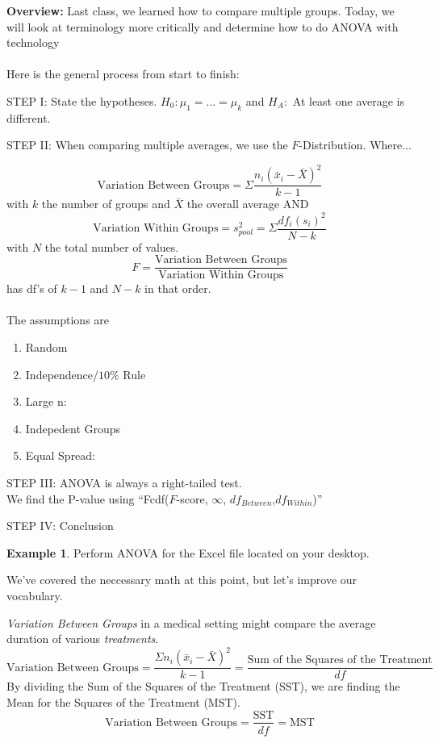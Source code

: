 \documentclass[12pt]{amsart}
\theoremstyle{definition}
\newtheorem{ex}{Example}
\begin{document}
 \textbf{Overview:} Last class, we learned how to compare multiple groups. Today, we will look at terminology more critically and determine how to do ANOVA with technology\\
 ~\\
Here is the general process from start to finish:
\begin{framed}
STEP I: State the hypotheses. $H_0:\mu_1=...=\mu_k$ and $H_A:$ At least one average is different.

STEP II: When comparing multiple averages, we use the $F$-Distribution. Where...

$$\text{Variation Between Groups}=\Sigma \frac{n_i(\bar{x}_i-\bar{X})^2}{k-1}$$ with $k$ the number of groups and $\bar{X}$ the overall average AND
$$\text{Variation Within Groups}=s_{pool}^2=\Sigma \frac{df_i(s_i)^2}{N-k}$$ with $N$ the total number of values.
$$F=\frac{\text{Variation Between Groups}}{\text{Variation Within Groups}}$$ has df's of $k-1$ and $N-k$ in that order.\\
~\\
The assumptions are
\begin{enumerate}
 \item Random
 \item Independence/$10\%$ Rule
 \item Large n:
 \item Indepedent Groups
 \item Equal Spread:
 
 \vspace{0.5in}
\end{enumerate}

STEP III: ANOVA is always a right-tailed test.\\ We find the P-value using ``Fcdf($F$-score, $\infty$, $df_{Between}$,$df_{Within}$)''

STEP IV: Conclusion

\end{framed}

\begin{ex} Perform ANOVA for the Excel file located on your desktop.
\end{ex}

\vfill
\newpage
We've covered the neccessary math at this point, but let's improve our vocabulary.
\begin{framed}
 \emph{Variation Between Groups} in a medical setting might compare the average duration of various \emph{treatments}.
 $$\text{Variation Between Groups}=\frac{\Sigma n_i(\bar{x}_i-\bar{X})^2}{k-1}=\frac{\text{Sum of the Squares of the Treatment}}{df}$$
 By dividing the Sum of the Squares of the Treatment (SST), we are finding the Mean for the Squares of the Treatment (MST).
 $$\text{Variation Between Groups}=\frac{\text{SST}}{df}=\text{MST}$$
\end{framed}
\end{document}
